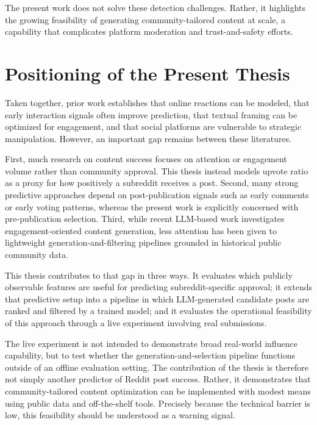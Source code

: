 The present work does not solve these detection challenges. Rather, it highlights the growing feasibility of generating community-tailored content at scale, a capability that complicates platform moderation and trust-and-safety efforts.

\section{Positioning of the Present Thesis}

Taken together, prior work establishes that online reactions can be modeled, that early interaction signals often improve prediction, that textual framing can be optimized for engagement, and that social platforms are vulnerable to strategic manipulation. However, an important gap remains between these literatures.

First, much research on content success focuses on attention or engagement volume rather than community approval. This thesis instead models upvote ratio as a proxy for how positively a subreddit receives a post. Second, many strong predictive approaches depend on post-publication signals such as early comments or early voting patterns, whereas the present work is explicitly concerned with pre-publication selection. Third, while recent LLM-based work investigates engagement-oriented content generation, less attention has been given to lightweight generation-and-filtering pipelines grounded in historical public community data.

This thesis contributes to that gap in three ways. It evaluates which publicly observable features are useful for predicting subreddit-specific approval; it extends that predictive setup into a pipeline in which LLM-generated candidate posts are ranked and filtered by a trained model; and it evaluates the operational feasibility of this approach through a live experiment involving real submissions.

The live experiment is not intended to demonstrate broad real-world influence capability, but to test whether the generation-and-selection pipeline functions outside of an offline evaluation setting. The contribution of the thesis is therefore not simply another predictor of Reddit post success. Rather, it demonstrates that community-tailored content optimization can be implemented with modest means using public data and off-the-shelf tools. Precisely because the technical barrier is low, this feasibility should be understood as a warning signal.
